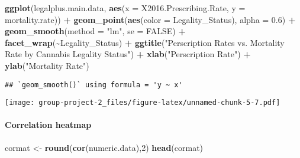 \documentclass[
]{article}
\newenvironment{Shaded}{\begin{snugshade}}{\end{snugshade}}
\newcommand{\AttributeTok}[1]{\textcolor[rgb]{0.13,0.29,0.53}{#1}}
\newcommand{\ConstantTok}[1]{\textcolor[rgb]{0.56,0.35,0.01}{#1}}
\newcommand{\DecValTok}[1]{\textcolor[rgb]{0.00,0.00,0.81}{#1}}
\newcommand{\FloatTok}[1]{\textcolor[rgb]{0.00,0.00,0.81}{#1}}
\newcommand{\FunctionTok}[1]{\textcolor[rgb]{0.13,0.29,0.53}{\textbf{#1}}}
\newcommand{\NormalTok}[1]{#1}
\newcommand{\OtherTok}[1]{\textcolor[rgb]{0.56,0.35,0.01}{#1}}
\newcommand{\SpecialCharTok}[1]{\textcolor[rgb]{0.81,0.36,0.00}{\textbf{#1}}}
\newcommand{\StringTok}[1]{\textcolor[rgb]{0.31,0.60,0.02}{#1}}
\begin{document}
\begin{Shaded}
\begin{Highlighting}[]
\FunctionTok{ggplot}\NormalTok{(legalplus.main.data, }\FunctionTok{aes}\NormalTok{(}\AttributeTok{x =}\NormalTok{ X2016.Prescribing.Rate, }\AttributeTok{y =}\NormalTok{ mortality.rate)) }\SpecialCharTok{+}
  \FunctionTok{geom\_point}\NormalTok{(}\FunctionTok{aes}\NormalTok{(}\AttributeTok{color =}\NormalTok{ Legality\_Status), }\AttributeTok{alpha =} \FloatTok{0.6}\NormalTok{) }\SpecialCharTok{+}
  \FunctionTok{geom\_smooth}\NormalTok{(}\AttributeTok{method =} \StringTok{"lm"}\NormalTok{, }\AttributeTok{se =} \ConstantTok{FALSE}\NormalTok{) }\SpecialCharTok{+}
  \FunctionTok{facet\_wrap}\NormalTok{(}\SpecialCharTok{\textasciitilde{}}\NormalTok{Legality\_Status) }\SpecialCharTok{+}
  \FunctionTok{ggtitle}\NormalTok{(}\StringTok{"Perscription Rates vs. Mortality Rate by Cannabis Legality Status"}\NormalTok{) }\SpecialCharTok{+}
  \FunctionTok{xlab}\NormalTok{(}\StringTok{"Perscription Rate"}\NormalTok{) }\SpecialCharTok{+}
  \FunctionTok{ylab}\NormalTok{(}\StringTok{"Mortality Rate"}\NormalTok{)}
\end{Highlighting}
\end{Shaded}

\begin{verbatim}
## `geom_smooth()` using formula = 'y ~ x'
\end{verbatim}

\texttt{[image: group-project-2\_files/figure-latex/unnamed-chunk-5-7.pdf]}

\hypertarget{correlation-heatmap}{%
\paragraph{Correlation heatmap}\label{correlation-heatmap}}

\begin{Shaded}
\end{Shaded}

\begin{Shaded}
\begin{Highlighting}[]
\NormalTok{cormat }\OtherTok{\textless{}{-}} \FunctionTok{round}\NormalTok{(}\FunctionTok{cor}\NormalTok{(numeric.data),}\DecValTok{2}\NormalTok{)}
\FunctionTok{head}\NormalTok{(cormat)}
\end{Highlighting}
\end{Shaded}
\end{document}

